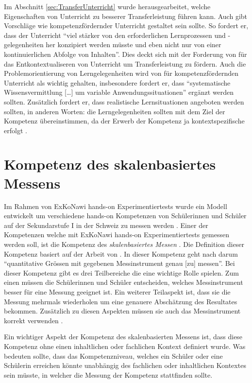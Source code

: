 Im Abschnitt \ref{sec:TransferUnterricht} wurde herausgearbeitet, welche Eigenschaften von Unterricht zu besserer Transferleistung führen kann. Auch \citet{Lersch2007} gibt Vorschläge wie kompetenzfördernder Unterricht gestaltet sein sollte. So fordert er, dass der Unterricht "`viel stärker von den erforderlichen Lernprozessen und -gelegenheiten her konzipiert werden müsste und eben nicht nur von einer kontinuierlichen Abfolge von Inhalten"'. Dies deckt sich mit der Forderung von \citet{Mietzel2007} für das Entkontextualiseren von Unterricht um Transferleistung zu fördern. Auch die Problemorientierung von Lerngelegenheiten wird von \citet{Lersch2007} für kompetenzfördernden Unterricht als wichtig gehalten, insbesondere fordert er, dass "`systematische Wissensvermittlung […] um variable Anwendungssituationen"' ergänzt werden sollten. Zusätzlich fordert er, dass realistische Lernsituationen angeboten werden sollten, in anderen Worten: die Lerngelegenheiten sollten mit dem Ziel der Kompetenz übereinstimmen, da der Erwerb der Kompetenz ja kontextspezifische erfolgt \citep{Klieme2004}.



\section{Kompetenz des skalenbasiertes Messens}

Im Rahmen von ExKoNawi hands-on Experimentiertests wurde ein Modell entwickelt um verschiedene hands-on Kompetenzen von Schülerinnen und Schüler auf der Sekundarstufe I in der Schweiz zu messen werden \citep{Metzger2013}. Einer der Kompetenzen welche mit ExKoNawi hands-on Experimentiertests gemessen werden soll, ist die Kompetenz des \textit{skalenbasiertes Messen} \citep{Gut2013a}. Die Definition dieser Kompetenz basiert auf der Arbeit von \citet{Munier2013}. In dieser Kompetenz geht nach \citep{Gut2013a} darum "`quantitative Grössen mit gegebenen Messinstrument genau [zu] messen"'. Bei dieser Kompetenz gibt es drei Teilbereiche die eine wichtige Rolle spielen. Zum einen müssen die Schülerinnen und Schüler entscheiden, welches Messinstrument besser für eine Messung geeignet ist. Ein weiterer Teilaspekt ist, dass sie die Messung mehrmals wiederholen um eine genauere Abschätzung des Resultates bekommen. Zusätzlich zu diesen Aspekten müssen sie auch das Messinstrument korrekt verwenden \citep{Munier2013,Gut2013a}.

Ein wichtiger Aspekt der Kompetenz des skalenbasierten Messens ist, dass diese Kompetenz ohne einen inhaltlichen oder fachlichen Kontext definiert wurde. Was bedeuten sollte, dass das Kompetenzniveau, welches ein Schüler oder eine Schülerin erreichen könnte unabhängig des fachlichen oder inhaltlichen Kontextes sein müsste, in welcher die Messung der Kompetenz stattfinden sollte.

